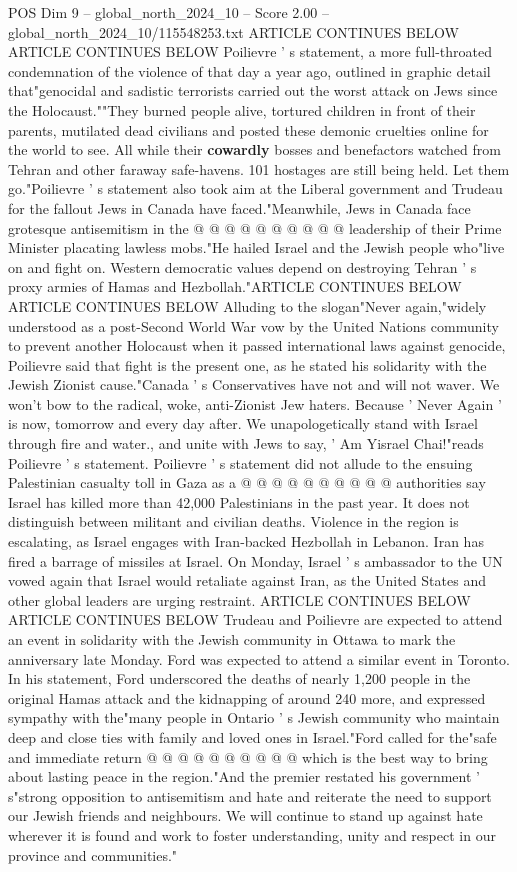 \begin{textsample}{POS Dim 9 – global\_north\_2024\_10 – Score 2.00 – global\_north\_2024\_10/115548253.txt}
ARTICLE CONTINUES BELOW ARTICLE CONTINUES BELOW Poilievre ' s statement, a more full-throated condemnation of the violence of that day a year ago, outlined in graphic detail that"genocidal and sadistic terrorists carried out the worst attack on Jews since the Holocaust.""They burned people alive, tortured children in front of their parents, mutilated dead civilians and posted these demonic cruelties online for the world to see.
All while their \textbf{cowardly} bosses and benefactors watched from Tehran and other faraway safe-havens. 101 hostages are still being held.
Let them go."Poilievre ' s statement also took aim at the Liberal government and Trudeau for the fallout Jews in Canada have faced."Meanwhile, Jews in Canada face grotesque antisemitism in the @ @ @ @ @ @ @ @ @ @ leadership of their Prime Minister placating lawless mobs."He hailed Israel and the Jewish people who"live on and fight on.
Western democratic values depend on destroying Tehran ' s proxy armies of Hamas and Hezbollah."ARTICLE CONTINUES BELOW ARTICLE CONTINUES BELOW Alluding to the slogan"Never again,"widely understood as a post-Second World War vow by the United Nations community to prevent another Holocaust when it passed international laws against genocide, Poilievre said that fight is the present one, as he stated his solidarity with the Jewish Zionist cause."Canada ' s Conservatives have not and will not waver.
We won't bow to the radical, woke, anti-Zionist Jew haters.
Because ' Never Again ' is now, tomorrow and every day after.
We unapologetically stand with Israel through fire and water., and unite with Jews to say, ' Am Yisrael Chai!"reads Poilievre ' s statement.
Poilievre ' s statement did not allude to the ensuing Palestinian casualty toll in Gaza as a @ @ @ @ @ @ @ @ @ @ authorities say Israel has killed more than 42,000 Palestinians in the past year.
It does not distinguish between militant and civilian deaths.
Violence in the region is escalating, as Israel engages with Iran-backed Hezbollah in Lebanon.
Iran has fired a barrage of missiles at Israel.
On Monday, Israel ' s ambassador to the UN vowed again that Israel would retaliate against Iran, as the United States and other global leaders are urging restraint.
ARTICLE CONTINUES BELOW ARTICLE CONTINUES BELOW Trudeau and Poilievre are expected to attend an event in solidarity with the Jewish community in Ottawa to mark the anniversary late Monday.
Ford was expected to attend a similar event in Toronto.
In his statement, Ford underscored the deaths of nearly 1,200 people in the original Hamas attack and the kidnapping of around 240 more, and expressed sympathy with the"many people in Ontario ' s Jewish community who maintain deep and close ties with family and loved ones in Israel."Ford called for the"safe and immediate return @ @ @ @ @ @ @ @ @ @ which is the best way to bring about lasting peace in the region."And the premier restated his government ' s"strong opposition to antisemitism and hate and reiterate the need to support our Jewish friends and neighbours.
We will continue to stand up against hate wherever it is found and work to foster understanding, unity and respect in our province and communities."

\end{textsample}
